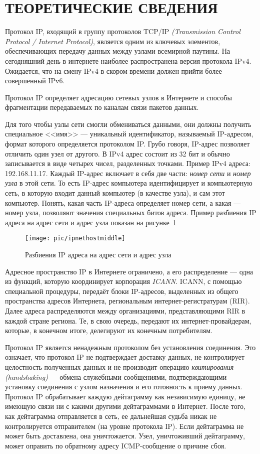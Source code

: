 \section{ТЕОРЕТИЧЕСКИЕ СВЕДЕНИЯ}

Протокол IP, входящий в группу протоколов TCP/IP \textit{(Transmission Control Protocol /
Internet Protocol)}, является одним из ключевых элементов, обеспечивающих
передачу данных между узлами всемирной паутины. На сегодняшний день в интернете
наиболее распространена версия протокола IPv4. Ожидается, что на смену IPv4
в скором времени должен прийти более совершенный IPv6.

Протокол IP определяет адресацию сетевых узлов в Интернете и способы
фрагментации передаваемых по каналам связи пакетов данных.

Для того чтобы узлы сети смогли обмениваться данными, они должны получить
специальное <<имя>> --- уникальный идентификатор, называемый IP-адресом,
формат которого определяется протоколом IP. Грубо говоря, IP-адрес позволяет
отличить один узел от другого. В IPv4 адрес состоит из 32 бит и обычно
записывается в виде четырех чисел, разделенных точками. Пример IPv4 адреса: 192.168.11.17.
Каждый IP-адрес включает в себя две части: \textit{номер сети} и
\textit{номер узла} в этой сети.
То есть IP-адрес компьютера идентифицирует и компьютерную сеть,
в которую входит данный компьютер (в качестве узла), и сам этот компьютер.
Понять, какая часть IP-адреса определяет номер сети, а какая --- номер узла,
позволяют значения специальных битов адреса.
Пример разбиения IP адреса на адрес сети и адрес узла показан на
рисунке~\ref{pic:ipnethostmiddle}
\begin{figure}[h!]
  \centering
  \texttt{[image: pic/ipnethostmiddle]}
  \caption{Разбиения IP адреса на адрес сети и адрес узла}
  \label{pic:ipnethostmiddle}
\end{figure}

Адресное пространство IP в Интернете ограничено, а его распределение --- одна из функций,
которую координирует корпорация \textit{ICANN}. ICANN, с помощью специальной процедуры,
передаёт блоки IP-адресов, выделенных из общего пространства адресов Интернета,
региональным интернет-регистратурам (RIR). Далее адреса распределяются между
организациями, представляющими RIR в каждой стране региона. Те, в свою очередь,
передают их интернет-провайдерам, которые, в конечном итоге,
делегируют их конечным потребителям.

Протокол IP является ненадежным протоколом без установления соединения.
Это означает, что протокол IP не подтверждает доставку данных,
не контролирует целостность полученных данных и не производит операцию
\textit{квитирования (handshaking)} --- обмена служебными сообщениями,
подтверждающими установку соединения с узлом назначения и его готовность
к приему данных. Протокол IP обрабатывает каждую дейтаграмму как независимую
единицу, не имеющую связи ни с какими другими дейтаграммами в Интернет.
После того, как дейтаграмма отправляется в сеть, ее дальнейшая судьба
никак не контролируется отправителем (на уровне протокола IP).
Если дейтаграмма не может быть доставлена, она уничтожается.
Узел, уничтоживший дейтаграмму, может оправить по обратному
адресу ICMP-сообщение о причине сбоя.

